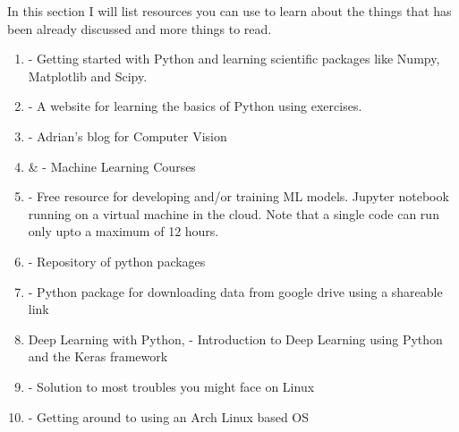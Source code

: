 \documentclass{../template/texnote}
\begin{document}
In this section I will list resources you can use to learn about the things that has been already discussed and more things to read. 
\begin{enumerate}
\item \cite{scipylectures} - Getting started with Python and learning scientific packages like Numpy, Matplotlib and Scipy.
\item \cite{exercism} - A website for learning the basics of Python using exercises.
\item \cite{pyimagesearch}  - Adrian's blog for Computer Vision
\item  \cite{coursera} \& \cite{udacity} - Machine Learning Courses
\item \cite{googlecolab} - Free resource for developing and/or training ML models. Jupyter notebook running on a virtual machine in the cloud. Note that a single code can run only upto a maximum of 12 hours.
\item \cite{pypi} - Repository of python packages
\item \cite{gdown} - Python package for downloading data from google drive using a shareable link
\item Deep Learning with Python, \cite{chollet_deep_2018} - Introduction to Deep Learning using Python and the Keras framework
\item \cite{archwiki} - Solution to most troubles you might face on Linux
\item \cite{lukesmith} - Getting around to using an Arch Linux based OS
\end{enumerate}

\renewcommand{\bibname}{References}
\end{document}
